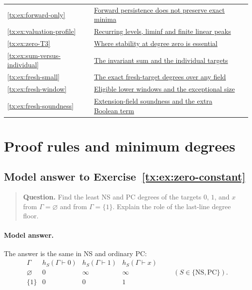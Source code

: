 \documentclass[11pt,a4paper,oneside,openany]{book}
\theoremstyle{definition}\newtheorem{definition}[theorem]{Definition}
\theoremstyle{remark}\newtheorem{remark}[theorem]{Remark}
\newcommand{\NS}{\mathrm{NS}}\newcommand{\PC}{\mathrm{PC}}
\numberwithin{equation}{chapter}
\begin{document}
\begin{longtable}{@{}lp{}r@{}}
\ref{tx:ex:forward-only} & \hyperref[tx:ans:forward-only]{Forward persistence does not preserve exact minima} & \pageref{tx:ans:forward-only}\\

\ref{tx:ex:valuation-profile} & \hyperref[tx:ans:valuation-profile]{Recurring levels, liminf and finite linear peaks} & \pageref{tx:ans:valuation-profile}\\

\ref{tx:ex:zero-T3} & \hyperref[tx:ans:zero-T3]{Where stability at degree zero is essential} & \pageref{tx:ans:zero-T3}\\

\ref{tx:ex:sum-versus-individual} & \hyperref[tx:ans:sum-versus-individual]{The invariant sum and the individual targets} & \pageref{tx:ans:sum-versus-individual}\\

\ref{tx:ex:fresh-small} & \hyperref[tx:ans:fresh-small]{The exact fresh-target degrees over any field} & \pageref{tx:ans:fresh-small}\\

\ref{tx:ex:fresh-window} & \hyperref[tx:ans:fresh-window]{Eligible lower windows and the exceptional size} & \pageref{tx:ans:fresh-window}\\

\ref{tx:ex:fresh-soundness} & \hyperref[tx:ans:fresh-soundness]{Extension-field soundness and the extra Boolean term} & \pageref{tx:ans:fresh-soundness}\\

\bottomrule
\end{longtable}
\clearpage

\section{Proof rules and minimum degrees}

\begin{samepage}

\subsection*{Model answer to Exercise~\ref{tx:ex:zero-constant}}\label{tx:ans:zero-constant}

\begin{quote}\small\textbf{Question.} Find the least NS and PC degrees of the targets $0$, $1$, and $x$ from
$\Gamma=\varnothing$ and from $\Gamma=\{1\}$. Explain the role of the
last-line degree floor.
\end{quote}

\paragraph{Model answer.}
The answer is the same in NS and ordinary PC:
\[
 \begin{array}{c|ccc}
 \Gamma & h_S(\Gamma\vdash0)&h_S(\Gamma\vdash1)&h_S(\Gamma\vdash x)\\
 \hline
 \varnothing&0&\infty&\infty\\
 \{1\}&0&0&1
 \end{array}
 \qquad(S\in\{\NS,\PC\}).
\]
\end{samepage}
\end{document}
